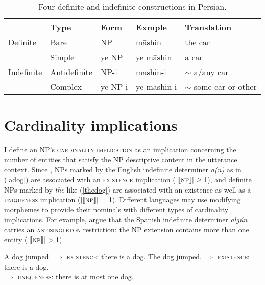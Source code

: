 \documentclass{salt}
\begin{document}
\begin {table}
\centering
{\small
\begin {tabular} {l | l | l | l | l}
& Type & Form & Exmple & Translation\\ \hline
Definite & Bare & \hspace{0.36cm} {\small NP} & \hspace{0.36cm} m\={a}shin & the car \\ \hdashline
& Simple & {\color {red}ye} {\small NP} & ye m\={a}shin & a car \\
Indefinite &Antidefinite & \hspace{0.36cm} \small{NP}-{\color {blue}i} & \hfill m\={a}shin-i & $\sim$ a/any car \\
&Complex& {\color {red}ye} {\small NP}-{\color {blue}i} & ye-m\={a}shin-i & $\sim$ some car or other \\
\end {tabular}
}
\caption {{\footnotesize Four definite and indefinite constructions in Persian.}}
\label {defindeftable}
\end {table}

\section{Cardinality implications} \label{cardinal}

I define an NP's \textsc{cardinality implication} as an implication concerning the number of entities that satisfy the NP descriptive content in the utterance context. Since \cite{russell1905denoting}, NPs marked by the English indefinite determiner \emph{a(n)} as in (\ref{adog}) are associated with an \textsc{existence} implication ($| \llbracket \textsc{np} \rrbracket |$$\geq$1), and definite NPs marked by \emph{the} like (\ref{thedog}) are associated with an existence as well as a \textsc{uniqueness} implication ($| \llbracket \textsc{np} \rrbracket |$$=$1). Different languages may use modifying morphemes to provide their nominals with different types of cardinality implications. For example, \cite{alonso2009modal} argue that the Spanish indefinite determiner \emph{alg\'{u}n} carries an \textsc{antisingleton} restriction: the NP extension contains more than one entity ($| \llbracket \textsc{np} \rrbracket |$$>$1). 

\begin {exe}
\ex \begin {xlist}
\ex \label {adog} A dog jumped. $\Rightarrow$ \textsc{existence}: there is a dog. \hfill
\ex \label {thedog} The dog jumped. $\Rightarrow$ \textsc{existence}: there is a dog. \\ \hspace*{3cm} $\Rightarrow$ \textsc{uniqueness}: there is at most one dog.
\end {xlist}
\end {exe}
\end{document}
